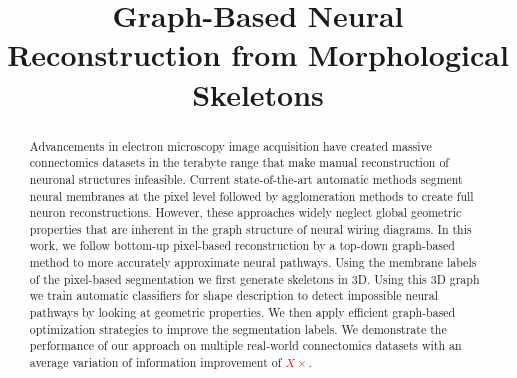 \documentclass[10pt,twocolumn,letterpaper]{article}
\newcommand{\FIX}[1]{\textcolor{red}{#1}}
\begin{document}
\title{Graph-Based Neural Reconstruction from Morphological Skeletons}



\maketitle
%

\begin{abstract}
Advancements in electron microscopy image acquisition have created massive connectomics datasets in the terabyte range that make manual reconstruction of neuronal structures infeasible. 
Current state-of-the-art automatic methods segment neural membranes at the pixel level followed by agglomeration methods to create full neuron reconstructions. 
However, these approaches widely neglect global geometric properties that are inherent in the graph structure of neural wiring diagrams.
In this work, we follow bottom-up pixel-based reconstruction by a top-down graph-based method to more accurately approximate neural pathways. 
Using the membrane labels of the pixel-based segmentation we first generate skeletons in 3D.
Using this 3D graph we train automatic classifiers for shape description to detect impossible neural pathways by looking at geometric properties.
We then apply efficient graph-based optimization strategies to improve the segmentation labels. We demonstrate the performance of our approach on multiple real-world connectomics datasets with an average variation of information improvement of \FIX{$X\times$}. 
\end{abstract}














{\small

}
\end{document}
